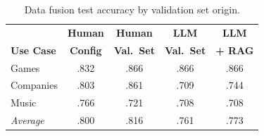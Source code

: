 
\begin{table}[t]
\caption{Data fusion test accuracy by validation set origin.}
\label{tab:fusion_results}
\centering
\setlength{\tabcolsep}{4pt}
\begin{tabular}{@{}lcccc@{}}
\toprule
 & \textbf{Human} & \textbf{Human} & \textbf{LLM} & \textbf{LLM} \\
\textbf{Use Case} & \textbf{Config} & \textbf{Val.\ Set} & \textbf{Val.\ Set} & \textbf{+ RAG} \\
\midrule
Games     & .832 & .866 & .866 & .866 \\
Companies & .803 & .861 & .709 & .744 \\
Music     & .766 & .721 & .708 & .708 \\
\midrule
\textit{Average} & .800 & .816 & .761 & .773 \\
\bottomrule
\end{tabular}
\end{table}

